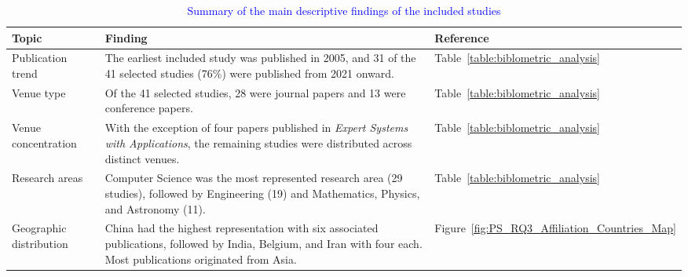 \begin{table}[H]
    \centering
    \caption{\textcolor{blue}{Summary of the main descriptive findings of the included studies}}
    \label{tab:descriptive-summary}
    \scriptsize
    \renewcommand{\arraystretch}{1.15}
    \begin{tabular}{|>{\raggedright\arraybackslash}p{}|>{\raggedright\arraybackslash}p{}|>{\raggedright\arraybackslash}p{}|}
        \hline
        \rowcolor{lightgray}
        \textbf{Topic} & \textbf{Finding} & \textbf{Reference} \\ \hline
        Publication trend & The earliest included study was published in 2005, and 31 of the 41 selected studies (76\%) were published from 2021 onward. & Table~\ref{table:biblometric_analysis} \\ \hline
        Venue type & Of the 41 selected studies, 28 were journal papers and 13 were conference papers. & Table~\ref{table:biblometric_analysis} \\ \hline
        Venue concentration & With the exception of four papers published in \textit{Expert Systems with Applications}, the remaining studies were distributed across distinct venues. & Table~\ref{table:biblometric_analysis} \\ \hline
        Research areas & Computer Science was the most represented research area (29 studies), followed by Engineering (19) and Mathematics, Physics, and Astronomy (11). & Table~\ref{table:biblometric_analysis} \\ \hline
        Geographic distribution & China had the highest representation with six associated publications, followed by India, Belgium, and Iran with four each. Most publications originated from Asia. & Figure~\ref{fig:PS_RQ3_Affiliation_Countries_Map} \\ \hline
    \end{tabular}
\end{table}
